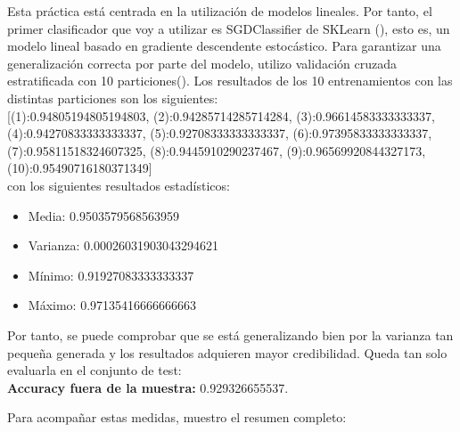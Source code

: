 Esta práctica está centrada en la utilización de modelos lineales. Por tanto, el primer clasificador que voy a utilizar es SGDClassifier de SKLearn (\cite{SGD-C}), esto  es, un modelo lineal basado en gradiente descendente estocástico. Para garantizar una generalización correcta por parte del modelo, utilizo validación cruzada estratificada con 10 particiones(\cite{stk}). Los resultados de los 10 entrenamientos con las distintas particiones son los siguientes: \\

[(1):0.94805194805194803, (2):0.94285714285714284, (3):0.96614583333333337, (4):0.94270833333333337, (5):0.92708333333333337, (6):0.97395833333333337, (7):0.95811518324607325, (8):0.9445910290237467, (9):0.96569920844327173, (10):0.95490716180371349] \\


con los siguientes resultados estadísticos:

\begin{itemize}
	\item Media: 0.9503579568563959
	\item Varianza: 0.00026031903043294621
	\item Mínimo: 0.91927083333333337
	\item Máximo: 0.97135416666666663
\end{itemize}

Por tanto, se puede comprobar que se está generalizando bien por la varianza tan pequeña generada y los resultados adquieren mayor credibilidad. Queda tan solo evaluarla en el conjunto de test: \\

\textbf{Accuracy fuera de la muestra:} 0.929326655537.

Para acompañar estas medidas, muestro el resumen completo:

